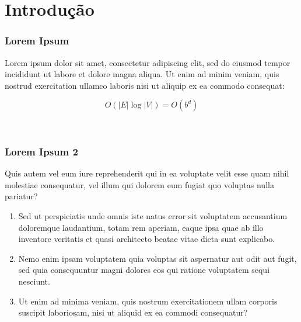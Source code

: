 %
%
%
%
\section{Introdução}
\begin{frame}
    \frametitle{Lorem Ipsum}

    Lorem ipsum dolor sit amet, consectetur adipiscing elit, sed do eiusmod tempor incididunt ut labore et dolore magna aliqua. Ut enim ad minim veniam, quis nostrud exercitation ullamco laboris nisi ut aliquip ex ea commodo consequat:

    \begin{equation}
        O(|E|\log{|V|}) = O(b^{d})
    \end{equation}

    \,\\

\end{frame}

\begin{frame}
    \frametitle{Lorem Ipsum 2}

    Quis autem vel eum iure reprehenderit qui in ea voluptate velit esse quam nihil molestiae consequatur, vel illum qui dolorem eum fugiat quo voluptas nulla pariatur?
    
    \begin{enumerate}
        \item Sed ut perspiciatis unde omnis iste natus error sit voluptatem accusantium doloremque laudantium, totam rem aperiam, eaque ipsa quae ab illo inventore veritatis et quasi architecto beatae vitae dicta sunt explicabo.
        \item Nemo enim ipsam voluptatem quia voluptas sit aspernatur aut odit aut fugit, sed quia consequuntur magni dolores eos qui ratione voluptatem sequi nesciunt.
        \item Ut enim ad minima veniam, quis nostrum exercitationem ullam corporis suscipit laboriosam, nisi ut aliquid ex ea commodi consequatur?
    \end{enumerate}
\end{frame}

